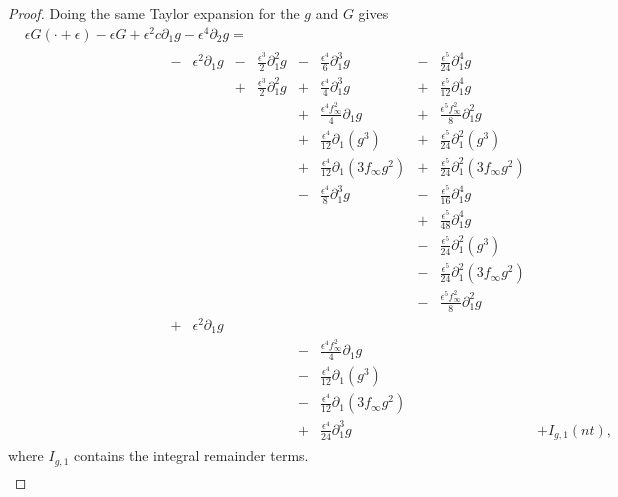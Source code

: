 \begin{proof}
	Doing the same Taylor expansion for the \(g\) and \(G\) gives
	\begin{equation*}
		\begin{aligned}
			&\epsilon G(\cdot + \epsilon) - \epsilon G + \epsilon^2c \partial_1 g - \epsilon^4 \partial_2 g  = \\
			&\hspace{10em}\begin{aligned}
				- & \epsilon^2 \partial_1 g & -&\frac{\epsilon^3} 2 \partial_1^2 g & - &\frac{\epsilon^4} 6 \partial_1^3 g & - & \frac{\epsilon^5}{24} \partial_1^4 g \\
				& & +&\frac{\epsilon^3} 2 \partial_1^2 g & + &\frac{\epsilon^4} 4\partial_1^3 g &+ & \frac{\epsilon^5}{12} \partial_1^4 g \\
				& & & & + &\frac{\epsilon^4 f_\infty^2} 4\partial_1 g & + & \frac{\epsilon^5f_\infty^2} 8 \partial_1^2 g  \\
				& & & & + &\frac{\epsilon^4} {12}\partial_1 (g^3) & + & \frac{\epsilon^5}{24} \partial_1^2(g^3) \\
				& & & & + &\frac{\epsilon^4} {12}\partial_1 (3f_\infty g^2) & + & \frac{\epsilon^5}{24}\partial_1^2(3f_\infty g^2)  \\
				& & & & - &\frac{\epsilon^4} {8}\partial_1^3 g & - &  \frac{\epsilon^5}{16} \partial_1^4 g  \\ 
				& & & & & & + & \frac{\epsilon^5}{48} \partial_1^4 g  \\
				& & & & & & - & \frac{\epsilon^5}{24} \partial_1^2(g^3) \\
				& & & & & & - & \frac{\epsilon^5}{24} \partial_1^2(3f_\infty g^2) \\
				& & & & & & - & \frac{\epsilon^5 f_\infty ^2} 8 \partial_1^2 g  \\
				+&\epsilon^2 \partial_1g \\
				& & & & - & \frac{\epsilon^4f_\infty ^2}{4} \partial_1 g \\
				& & & & - &\frac{\epsilon^4} {12}\partial_1 (g^3) \\
				& & & & - &\frac{\epsilon^4} {12}\partial_1 (3f_\infty g^2) \\ 
				& & & & + & \frac{\epsilon^4}{24} \partial_1^3 g && &+ I_{g,1}(nt),
			\end{aligned}
		\end{aligned}
	\end{equation*}
	where \(I_{g,1}\) contains the integral remainder terms.
	\begin{equation}\label{Ig1}
	\begin{aligned}

\end{aligned}
\end{equation}
\end{proof}
